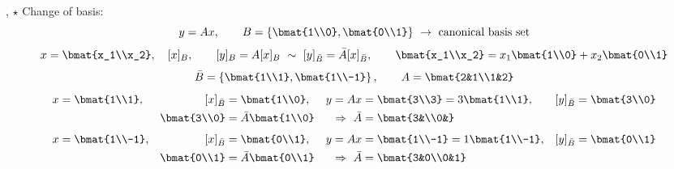 \sep
$\star$ Change of basis:
\[
y=Ax,\qquad B=\left\{\bmat{1\\0},\bmat{0\\1}\right\}\ \to\ \text{canonical basis set}
\]
\[
x=\bmat{x_1\\x_2},\quad [x]_B,\qquad [y]_B=A[x]_B\ \sim\ [y]_{\bar{B}}=\bar{A}[x]_{\bar{B}},
\qquad
\bmat{x_1\\x_2}=x_1\bmat{1\\0}+x_2\bmat{0\\1}
\]
\[
\bar{B}=\left\{\bmat{1\\1},\bmat{1\\-1}\right\},\qquad A=\bmat{2&1\\1&2}
\]
\begin{align*}
x&=\bmat{1\\1}, & [x]_{\bar{B}}&=\bmat{1\\0}, & y=Ax&=\bmat{3\\3}=3\bmat{1\\1}, & [y]_{\bar{B}}&=\bmat{3\\0}\\
&& \bmat{3\\0}&=\bar{A}\bmat{1\\0} & \Rightarrow\ \bar{A}&=\bmat{3&\\0&}\\[4pt]
x&=\bmat{1\\-1}, & [x]_{\bar{B}}&=\bmat{0\\1}, & y=Ax&=\bmat{1\\-1}=1\bmat{1\\-1}, & [y]_{\bar{B}}&=\bmat{0\\1}\\
&& \bmat{0\\1}&=\bar{A}\bmat{0\\1} & \Rightarrow\ \bar{A}&=\bmat{3&0\\0&1}
\end{align*}

